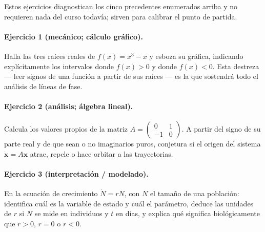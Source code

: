 Estos ejercicios diagnostican los cinco precedentes enumerados arriba y no requieren nada del curso todavía; sirven para calibrar el punto de partida.

\paragraph{Ejercicio 1 (mecánico; cálculo gráfico).} Halla las tres raíces reales de $f(x) = x^3 - x$ y esboza su gráfica, indicando explícitamente los intervalos donde $f(x)>0$ y donde $f(x)<0$. Esta destreza --- leer signos de una función a partir de sus raíces --- es la que sostendrá todo el análisis de líneas de fase.

\paragraph{Ejercicio 2 (análisis; álgebra lineal).} Calcula los valores propios de la matriz $A=\begin{pmatrix} 0 & 1 \\ -1 & 0\end{pmatrix}$. A partir del signo de su parte real y de que sean o no imaginarios puros, conjetura si el origen del sistema $\dot{\mathbf{x}}=A\mathbf{x}$ atrae, repele o hace orbitar a las trayectorias.

\paragraph{Ejercicio 3 (interpretación / modelado).} En la ecuación de crecimiento $\dot{N} = rN$, con $N$ el tamaño de una población: identifica cuál es la variable de estado y cuál el parámetro, deduce las unidades de $r$ si $N$ se mide en individuos y $t$ en días, y explica qué significa biológicamente que $r>0$, $r=0$ o $r<0$.


